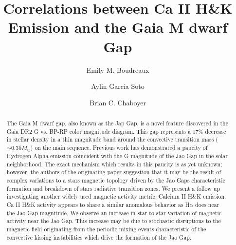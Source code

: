 \documentclass[twocolumn]{aastex62}
\begin{document}
\title{Correlations between Ca II H\&K Emission and the Gaia M dwarf Gap}


\author[0000-0002-2600-7513]{Emily M. Boudreaux}

\author[0000-0001-9828-3229]{Aylin Garcia Soto}

\author[0000-0003-3096-4161]{Brian C. Chaboyer}

\received{}
\revised{}
\revised{}
\accepted{}


\begin{abstract}
  The Gaia M dwarf gap, also known as the Jap Gap, is a novel feature
  discovered in the Gaia DR2 G vs. BP-RP color magnitude diagram. This gap
  represents a 17\% decrease in stellar density in a thin magnitude band around the
  convective transition mass ($\sim 0.35 M_{\odot}$) on the main sequence.
  Previous work has demonstrated a paucity of Hydrogen
  Alpha emission coincident with the G magnitude of the Jao Gap in the solar
  neighborhood. The exact mechanism which results in this paucity is as yet
  unknown; however, the authors of the originating paper suggestion that it may
  be the result of complex variations to a stars magnetic topology driven by
  the Jao Gaps characteristic formation and breakdown of stars radiative
  transition zones. We present a follow up investigating another widely used
  magnetic activity metric, Calcium II H\&K emission. Ca II H\&K activity
  appears to share a similar anomalous behavior as H$\alpha$ does near the Jao
  Gap magnitude. We observe an increase in star-to-star variation of magnetic
  activity near the Jao Gap. This increase may be due to stochastic disruptions
  to the magnetic field originating from the periodic mixing events
  characteristic of the convective kissing instabilities which drive the
  formation of the Jao Gap.

\end{abstract}



\end{document}
